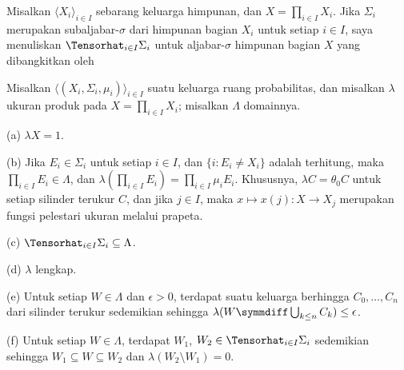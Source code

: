  Misalkan $\langle X_i\rangle_{i\in I}$ sebarang
keluarga himpunan, dan $X=\prod_{i\in I}X_i$. Jika $\Sigma_i$ merupakan
subaljabar-$\sigma$ dari himpunan bagian $X_i$ untuk setiap $i\in I$, saya menuliskan
$\Tensorhat_{i\in I}\Sigma_i$ untuk aljabar-$\sigma$ himpunan bagian $X$
yang dibangkitkan oleh



 Misalkan $\langle(X_i,\Sigma_i,\mu_i)\rangle_{i\in I}$
suatu keluarga ruang probabilitas, dan misalkan $\lambda$ ukuran produk
pada $X=\prod_{i\in I}X_i$; misalkan
$\Lambda$ domainnya.

(a) $\lambda X=1$.

(b) Jika $E_i\in\Sigma_i$ untuk setiap $i\in I$, dan $\{i:E_i\ne X_i\}$ adalah
terhitung, maka $\prod_{i\in I}E_i\in\Lambda$, dan
$\lambda(\prod_{i\in I}E_i)=\prod_{i\in I}\mu_iE_i$. Khususnya,
$\lambda C=\theta_0C$
untuk setiap silinder terukur $C$, dan jika
$j\in I$, maka $x\mapsto x(j):X\to X_j$ merupakan fungsi pelestari ukuran melalui prapeta.

(c) $\Tensorhat_{i\in I}\Sigma_i\subseteq\Lambda$.

(d) $\lambda$ lengkap.

(e) Untuk setiap $W\in\Lambda$ dan $\epsilon>0$, terdapat suatu keluarga berhingga
$C_0,\ldots,C_n$ dari silinder terukur sedemikian sehingga
$\lambda(W\symmdiff\bigcup_{k\le n}C_k)\penalty-100\le\epsilon$.

(f) Untuk setiap $W\in\Lambda$, terdapat $W_1$,
$W_2\in\Tensorhat_{i\in I}\Sigma_i$ sedemikian sehingga
$W_1\subseteq W\subseteq W_2$ dan $\lambda(W_2\setminus W_1)=0$.


